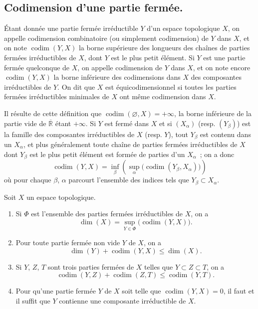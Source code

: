 \subsection{Codimension d'une partie fermée.}
\label{subsection:0.14.2-fr}

\begin{definition}[14.2.1]
\label{0.14.2.1-fr}
Étant donnée une partie fermée irréductible $Y$ d'un espace topologique $X$,
on appelle codimension combinatoire \textup{(ou simplement} codimension)
de $Y$ dans $X$, et on note $\operatorname{codim}(Y,X)$ la borne supérieure
des longueurs des chaînes de parties fermées irréductibles de $X$, dont $Y$
est le plus petit élément. Si $Y$ est une partie fermée quelconque de $X$, on
appelle codimension de $Y$ dans $X$, et on note encore
$\operatorname{codim}(Y,X)$ la borne inférieure des codimensions dans $X$ des
composantes irréductibles de $Y$. On dit que $X$ est
équicodimensionnel si toutes les parties fermées irréductibles minimales
de $X$ ont même codimension dans $X$.
\end{definition}

Il résulte de cette définition que
$\operatorname{codim}(\varnothing,X)=+\infty$, la borne inférieure de la
partie vide de $\overline{\mathbb R}$ étant $+\infty$. Si $Y$ est fermé dans
$X$ et si $(X_\alpha)$ (resp. $(Y_\beta)$) est la famille des composantes
irréductibles de $X$ (resp. $Y$), tout $Y_\beta$ est contenu dans un
$X_\alpha$, et plus généralement toute chaîne de parties fermées
irréductibles de $X$ dont $Y_\beta$ est le plus petit élément est formée de
parties d'un $X_\alpha$~; on a donc
\[
  \operatorname{codim}(Y,X)=
  \inf_\beta\left(\sup_\alpha
  \bigl(\operatorname{codim}(Y_\beta,X_\alpha)\bigr)\right)
  \tag{14.2.1.1}\label{0.14.2.1.1-fr}
\]
où pour chaque $\beta$, $\alpha$ parcourt l'ensemble des indices tels que
$Y_\beta\subset X_\alpha$.

\begin{proposition}[14.2.2]
\label{0.14.2.2-fr}
Soit $X$ un espace topologique.
\begin{enumerate}
  \item[\rm(i)] Si $\Phi$ est l'ensemble des parties fermées irréductibles de
  $X$, on a
  \[
    \dim(X)=\sup_{Y\in\Phi}\bigl(\operatorname{codim}(Y,X)\bigr).
    \tag{14.2.2.1}\label{0.14.2.2.1-fr}
  \]
  \item[\rm(ii)] Pour toute partie fermée non vide $Y$ de $X$, on a
  \[
    \dim(Y)+\operatorname{codim}(Y,X)\leq\dim(X).
    \tag{14.2.2.2}\label{0.14.2.2.2-fr}
  \]
  \item[\rm(iii)] Si $Y$, $Z$, $T$ sont trois parties fermées de $X$ telles
  que $Y\subset Z\subset T$, on a
  \[
    \operatorname{codim}(Y,Z)+\operatorname{codim}(Z,T)
    \leq\operatorname{codim}(Y,T).
    \tag{14.2.2.3}\label{0.14.2.2.3-fr}
  \]
  \item[\rm(iv)] Pour qu'une partie fermée $Y$ de $X$ soit telle que
  $\operatorname{codim}(Y,X)=0$, il faut et il suffit que $Y$ contienne une
  composante irréductible de $X$.
\end{enumerate}
\end{proposition}

